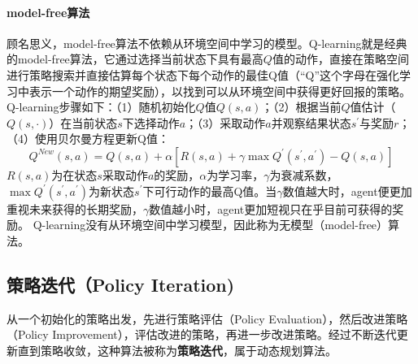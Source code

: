 \paragraph{model-free算法}
顾名思义，model-free算法不依赖从环境空间中学习的模型。Q-learning\cite{vanHasselt2012}就是经典的model-free算法\cite{Sutton1998,tdgam,TechnicalNote}，它通过选择当前状态下具有最高$Q$值的动作，直接在策略空间进行策略搜索并直接估算每个状态下每个动作的最佳Q值（“Q”这个字母在强化学习中表示一个动作的期望奖励），以找到可以从环境空间中获得更好回报的策略。
Q-learning步骤如下：（1）随机初始化$Q$值$Q(s,a)$；（2）根据当前$Q$值估计（$Q(s,\cdot)$）在当前状态$s$下选择动作$a$；（3）采取动作$a$并观察结果状态$s^{'}$与奖励$r$；（4）使用贝尔曼方程\cite{dixit1990optimization}更新Q值：
\begin{equation}
  Q^{New}(s,a) = Q(s,a) + \alpha[R(s,a) + \gamma \max Q^{'}(s^{'},a^{'}) - Q(s,a)]
\end{equation}
$R(s,a)$为在状态$s$采取动作$a$的奖励，$\alpha$为学习率，$\gamma$为衰减系数，$\max Q^{'}(s^{'},a^{'})$为新状态$s^{'}$下可行动作的最高Q值。当$\gamma$数值越大时，agent便更加重视未来获得的长期奖励，$\gamma$数值越小时，agent更加短视只在乎目前可获得的奖励。
Q-learning没有从环境空间中学习模型，因此称为无模型（model-free）算法。

\subsection{策略迭代（Policy Iteration)}
从一个初始化的策略出发，先进行策略评估（Policy Evaluation），然后改进策略（Policy Improvement），评估改进的策略，再进一步改进策略。经过不断迭代更新直到策略收敛，这种算法被称为\textbf{策略迭代}，属于动态规划算法\cite{Sutton1998}。
